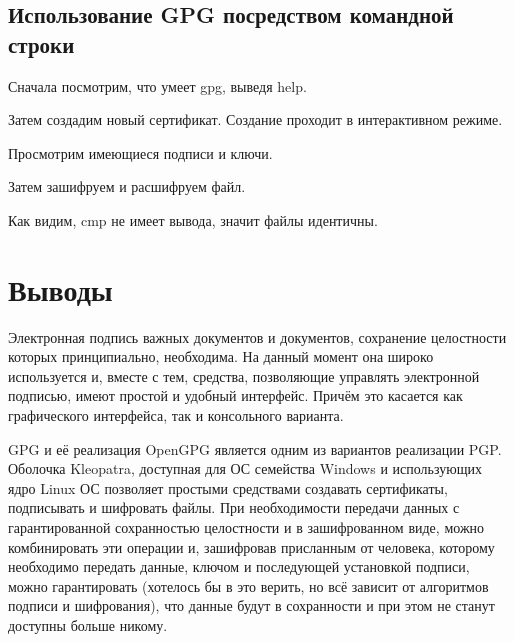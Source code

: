 \documentclass[a4paper]{article}
\begin{document}
\subsection{Использование GPG посредством командной строки}

Сначала посмотрим, что умеет gpg, выведя help.



Затем создадим новый сертификат. Создание проходит в интерактивном режиме.



Просмотрим имеющиеся подписи и ключи.



Затем зашифруем и расшифруем файл.



Как видим, cmp не имеет вывода, значит файлы идентичны.

\section{Выводы}

Электронная подпись важных документов и документов, сохранение целостности которых принципиально, необходима. На данный момент она широко используется и, вместе с тем, средства, позволяющие управлять электронной подписью, имеют простой и удобный интерфейс. Причём это касается как графического интерфейса, так и консольного варианта.

GPG и её реализация OpenGPG является одним из вариантов реализации PGP. Оболочка Kleopatra, доступная для ОС семейства Windows и использующих ядро Linux ОС позволяет простыми средствами создавать сертификаты, подписывать и шифровать файлы. При необходимости передачи данных с гарантированной сохранностью целостности и в зашифрованном виде, можно комбинировать эти операции и, зашифровав присланным от человека, которому необходимо передать данные, ключом и последующей установкой подписи, можно гарантировать (хотелось бы в это верить, но всё зависит от алгоритмов подписи и шифрования), что данные будут в сохранности и при этом не станут доступны больше никому.
\end{document}
